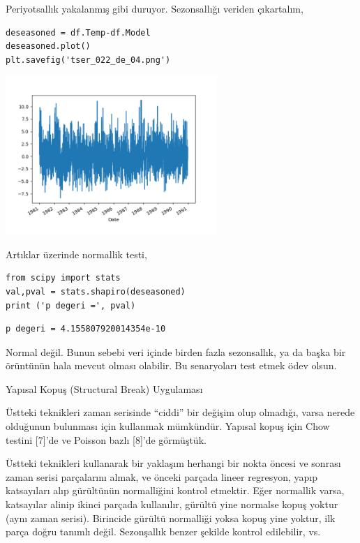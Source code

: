 \documentclass[12pt,fleqn]{article}\usepackage{../../common}
\begin{document}
Periyotsallık yakalanmış gibi duruyor. Sezonsallığı veriden çıkartalım,

\begin{verbatim}
deseasoned = df.Temp-df.Model
deseasoned.plot()
plt.savefig('tser_022_de_04.png')
\end{verbatim}

\includegraphics[height=6cm]{tser_022_de_04.png}

Artıklar üzerinde normallik testi,

\begin{verbatim}
from scipy import stats
val,pval = stats.shapiro(deseasoned)
print ('p degeri =', pval)
\end{verbatim}

\begin{verbatim}
p degeri = 4.155807920014354e-10
\end{verbatim}

Normal değil. Bunun sebebi veri içinde birden fazla sezonsallık, ya da başka bir
örüntünün hala mevcut olması olabilir. Bu senaryoları test etmek ödev olsun.

Yapısal Kopuş (Structural Break) Uygulaması

Üstteki teknikleri zaman serisinde ``ciddi'' bir değişim olup olmadığı, varsa
nerede olduğunun bulunması için kullanmak mümkündür. Yapısal kopuş için Chow
testini [7]'de ve Poisson bazlı [8]'de görmüştük. 

Üstteki teknikleri kullanarak bir yaklaşım herhangi bir nokta öncesi ve sonrası
zaman serisi parçalarını almak, ve önceki parçada lineer regresyon, yapıp
katsayıları alıp gürültünün normalliğini kontrol etmektir. Eğer normallik varsa,
katsayılar alinip ikinci parçada kullanılır, gürültü yine normalse kopuş yoktur
(aynı zaman serisi). Birincide gürültü normalliği yoksa kopuş yine yoktur, ilk
parça doğru tanımlı değil. Sezonşallık benzer şekilde kontrol edilebilir, vs.
\end{document}
